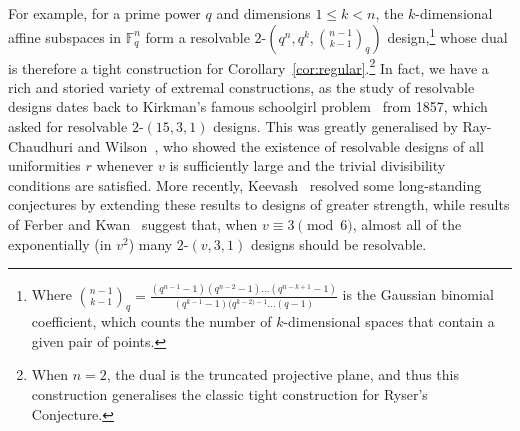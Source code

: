 \documentclass[a4paper,twoside,11pt]{article}
\numberwithin{thm}{section}
\theoremstyle{definition}
\theoremstyle{remark}
\theoremstyle{definition}
\begin{document}
For example, for a prime power $q$ and dimensions $1 \le k < n$, the $k$-dimensional affine subspaces in $\mathbb{F}_q^n$ form a resolvable $2$-$(q^n, q^k, \binom{n-1}{k-1}_q)$ design,\footnote{Where $\binom{n-1}{k-1}_q = \frac{(q^{n-1}-1)(q^{n-2} - 1) \hdots (q^{n-k+1} - 1)}{(q^{k-1} - 1)(q^{k-2)-1} \hdots (q-1)}$ is the Gaussian binomial coefficient, which counts the number of $k$-dimensional spaces that contain a given pair of points.} whose dual is therefore a tight construction for Corollary~\ref{cor:regular}.\footnote{When $n = 2$, the dual is the truncated projective plane, and thus this construction generalises the classic tight construction for Ryser's Conjecture.} In fact, we have a rich and storied variety of extremal constructions, as the study of resolvable designs dates back to Kirkman's famous schoolgirl problem~\cite{kirkman} from 1857, which asked for resolvable $2$-$(15,3,1)$ designs. This was greatly generalised by Ray-Chaudhuri and Wilson~\cite{RCW1, RCW2}, who showed the existence of resolvable designs of all uniformities $r$ whenever $v$ is sufficiently large and the trivial divisibility conditions are satisfied. More recently, Keevash~\cite{keevash} resolved some long-standing conjectures by extending these results to designs of greater strength, while results of Ferber and Kwan~\cite{Ferber-Kwan19} suggest that, when $v \equiv 3 \pmod 6$, almost all of the exponentially (in $v^2$) many $2$-$(v,3,1)$ designs should be resolvable.
\end{document}
